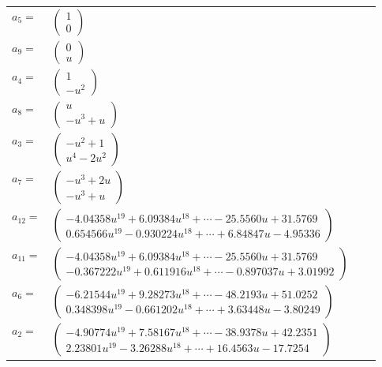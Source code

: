 \documentclass[1p]{elsarticle_modified}
\theoremstyle{definition}
\begin{document}
\begin{tabular}{m{7pt} m{180pt} m{7pt} m{180pt} }
\flushright $a_{5}=$&$\begin{pmatrix}1\\0\end{pmatrix}$ \\
\flushright $a_{9}=$&$\begin{pmatrix}0\\u\end{pmatrix}$ \\
\flushright $a_{4}=$&$\begin{pmatrix}1\\- u^2\end{pmatrix}$ \\
\flushright $a_{8}=$&$\begin{pmatrix}u\\- u^3+u\end{pmatrix}$ \\
\flushright $a_{3}=$&$\begin{pmatrix}- u^2+1\\u^4-2 u^2\end{pmatrix}$ \\
\flushright $a_{7}=$&$\begin{pmatrix}- u^3+2 u\\- u^3+u\end{pmatrix}$ \\
\flushright $a_{12}=$&$\begin{pmatrix}-4.04358 u^{19}+6.09384 u^{18}+\cdots-25.5560 u+31.5769\\0.654566 u^{19}-0.930224 u^{18}+\cdots+6.84847 u-4.95336\end{pmatrix}$ \\
\flushright $a_{11}=$&$\begin{pmatrix}-4.04358 u^{19}+6.09384 u^{18}+\cdots-25.5560 u+31.5769\\-0.367222 u^{19}+0.611916 u^{18}+\cdots-0.897037 u+3.01992\end{pmatrix}$ \\
\flushright $a_{6}=$&$\begin{pmatrix}-6.21544 u^{19}+9.28273 u^{18}+\cdots-48.2193 u+51.0252\\0.348398 u^{19}-0.661202 u^{18}+\cdots+3.63448 u-3.80249\end{pmatrix}$ \\
\flushright $a_{2}=$&$\begin{pmatrix}-4.90774 u^{19}+7.58167 u^{18}+\cdots-38.9378 u+42.2351\\2.23801 u^{19}-3.26288 u^{18}+\cdots+16.4563 u-17.7254\end{pmatrix}$ \\

\end{tabular}
\end{document}
